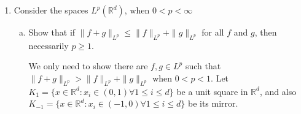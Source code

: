 \documentclass{article}
\begin{document}
\begin{enumerate}
\begin{enumerate}[(a)]
\begin{solution}
            When $p\alpha=d$, we have
            $$S_{d-1}^{-1}\|f_0\|_p^p=\int_0^1 \dfrac{dr}{r(\log(2/r))^p}.$$
            Using substitution $u=\log(2/r)$, the RHS becomes $\int_{\log 2}^\infty \dfrac{du}{u^p}$, which converges when $p>1$ and diverges when $p\leq 1$.

            When $p\alpha>d$, we want to prove $f_0\notin L^p$. We have
            \begin{align*}
                S_{d-1}^{-1} \int_{\mathbb R^d} |f_0|^p dx &= \int_0^1 \dfrac{r^{-p\alpha} r^{d-1}}{(\log (2/r))^p}dr\\
                &\geq \int_0^{1/2} \dfrac{dr}{r^{1+p\alpha -d} (\log (2/r))^p}\\
                &\geq \int_0^{1/2} \dfrac{dr}{r^{1+p\alpha-d}2^p (\log (1/r))^p}.
            \end{align*}
            The last step is because $2/r \leq 1/r^2$ whenever $0<r<1/2$. We now using $u=1/r$, RHS can be
            $$RHS \geq \int_2^\infty \dfrac{du}{2^p u^{1-p\alpha+d}(\log u)^p}.$$
            By assumption, $1-p\alpha+d<1$, we can now choose $\theta>0$ so that $1-p\alpha+d+\theta<1$, then choose $K>2$ big enough such that
            $(\log u)^p < u^\theta$ for all $u\geq K$, hence
            $$RHS \geq \int_K^\infty \dfrac{du}{2^p u^{1-p\alpha+d+\theta}} = +\infty,$$
            hence $f_0\notin L^p$.

            If the definition of $f_\infty$ changed to $$f_\infty(x) = \begin{cases}
                \abs x^{-\alpha} /\log(2\abs x) & \text{if } \abs x\geq1,\\
                0 & \text{if } \abs x< 1,
            \end{cases}$$
            then by a similar argument, we have $f_\infty\in L^p$ whenever $d<p\alpha$. When $p\alpha=d$, we can similarly prove that $f_\infty\in L^p$ iff $p>1$. Moreover,
            $f_\infty \notin L^p$ when $p\alpha<d$.
        \end{solution}
    \end{enumerate}
    \item Consider the spaces $L^p(\mathbb R^d)$, when $0<p<\infty$
    \begin{enumerate}[(a)]
        \item Show that if $\|f+g\|_{L^p}\leq \|f\|_{L^p} + \|g\|_{L^p}$ for all $f$ and $g$, then necessarily $p\geq 1$.

        \begin{solution}
            We only need to show there are $f,g\in L^p$ such that $\|f+g\|_{L^p}> \|f\|_{L^p} + \|g\|_{L^p}$ when $0<p<1$. Let $K_1=\{x\in \mathbb R^d: x_i\in (0,1) \forall 1\leq i\leq d\}$
            be a unit square in $\mathbb R^d$, and also $K_{-1}=\{x\in \mathbb R^d: x_i\in (-1,0) \forall 1\leq i\leq d\}$ be its mirror.


\end{solution}
\end{enumerate}
\end{enumerate}
\end{document}
